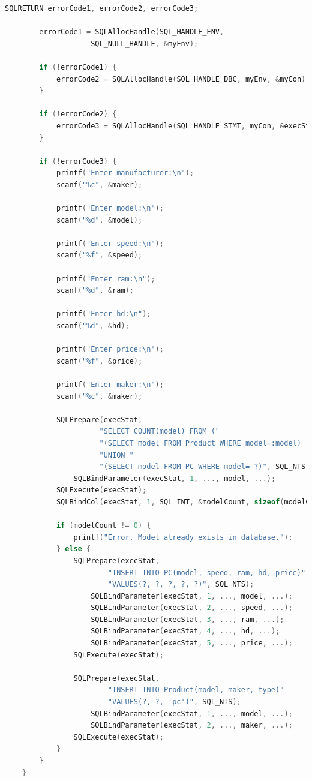 \documentclass[12pt]{article}
\begin{document}
\begin{enumerate}[1.]
\begin{enumerate}[a)]
\begin{lstlisting}[language=c]
        SQLRETURN errorCode1, errorCode2, errorCode3;

        errorCode1 = SQLAllocHandle(SQL_HANDLE_ENV,
                    SQL_NULL_HANDLE, &myEnv);

        if (!errorCode1) {
            errorCode2 = SQLAllocHandle(SQL_HANDLE_DBC, myEnv, &myCon);
        }

        if (!errorCode2) {
            errorCode3 = SQLAllocHandle(SQL_HANDLE_STMT, myCon, &execStat);
        }

        if (!errorCode3) {
            printf("Enter manufacturer:\n");
            scanf("%c", &maker);

            printf("Enter model:\n");
            scanf("%d", &model);

            printf("Enter speed:\n");
            scanf("%f", &speed);

            printf("Enter ram:\n");
            scanf("%d", &ram);

            printf("Enter hd:\n");
            scanf("%d", &hd);

            printf("Enter price:\n");
            scanf("%f", &price);

            printf("Enter maker:\n");
            scanf("%c", &maker);

            SQLPrepare(execStat,
                      "SELECT COUNT(model) FROM ("
                      "(SELECT model FROM Product WHERE model=:model) "
                      "UNION "
                      "(SELECT model FROM PC WHERE model= ?)", SQL_NTS);
                SQLBindParameter(execStat, 1, ..., model, ...);
            SQLExecute(execStat);
            SQLBindCol(execStat, 1, SQL_INT, &modelCount, sizeof(modelCount), &modelCountInfo);

            if (modelCount != 0) {
                printf("Error. Model already exists in database.");
            } else {
                SQLPrepare(execStat,
                        "INSERT INTO PC(model, speed, ram, hd, price)"
                        "VALUES(?, ?, ?, ?, ?)", SQL_NTS);
                    SQLBindParameter(execStat, 1, ..., model, ...);
                    SQLBindParameter(execStat, 2, ..., speed, ...);
                    SQLBindParameter(execStat, 3, ..., ram, ...);
                    SQLBindParameter(execStat, 4, ..., hd, ...);
                    SQLBindParameter(execStat, 5, ..., price, ...);
                SQLExecute(execStat);

                SQLPrepare(execStat,
                        "INSERT INTO Product(model, maker, type)"
                        "VALUES(?, ?, 'pc')", SQL_NTS);
                    SQLBindParameter(execStat, 1, ..., model, ...);
                    SQLBindParameter(execStat, 2, ..., maker, ...);
                SQLExecute(execStat);
            }
        }
    }
    \end{lstlisting}


\end{enumerate}
\end{enumerate}
\end{document}
